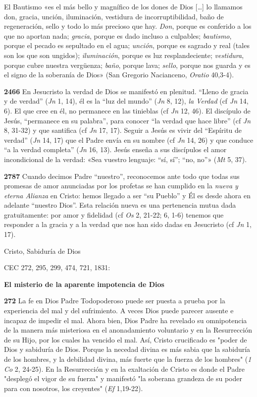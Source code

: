 \documentclass[]{article}
\begin{document}
El Bautismo «es el más bello y magnífico de los dones de Dios [\ldots{}]
lo llamamos don, gracia, unción, iluminación, vestidura de
incorruptibilidad, baño de regeneración, sello y todo lo más precioso
que hay. \emph{Don}, porque es conferido a los que no aportan nada;
\emph{gracia}, porque es dado incluso a culpables; \emph{bautismo},
porque el pecado es sepultado en el agua; \emph{unción}, porque es
sagrado y real (tales son los que son ungidos); \emph{iluminación},
porque es luz resplandeciente; \emph{vestidura}, porque cubre nuestra
vergüenza; \emph{baño}, porque lava; \emph{sello}, porque nos guarda y
es el signo de la soberanía de Dios» (San Gregorio Nacianceno,
\emph{Oratio} 40,3-4).

\textbf{2466} En Jesucristo la verdad de Dios se manifestó en plenitud.
``Lleno de gracia y de verdad'' (\emph{Jn} 1, 14), él es la ``luz del
mundo'' (\emph{Jn} 8, 12), \emph{la Verdad} (cf \emph{Jn} 14, 6). El que
cree en él, no permanece en las tinieblas (cf \emph{Jn} 12, 46). El
discípulo de Jesús, ``permanece en su palabra'', para conocer ``la
verdad que hace libre'' (cf \emph{Jn} 8, 31-32) y que santifica (cf
\emph{Jn} 17, 17). Seguir a Jesús es vivir del ``Espíritu de verdad''
(\emph{Jn} 14, 17) que el Padre envía en su nombre (cf \emph{Jn} 14, 26)
y que conduce ``a la verdad completa'' (\emph{Jn} 16, 13). Jesús enseña
a sus discípulos el amor incondicional de la verdad: «Sea vuestro
lenguaje: ``sí, sí''; ``no, no''» (\emph{Mt} 5, 37).

\textbf{2787} Cuando decimos Padre ``nuestro'', reconocemos ante todo
que todas sus promesas de amor anunciadas por los profetas se han
cumplido en la \emph{nueva y eterna Alianza} en Cristo: hemos llegado a
ser ``su Pueblo'' y Él es desde ahora en adelante ``nuestro Dios''. Esta
relación nueva es una pertenencia mutua dada gratuitamente: por amor y
fidelidad (cf \emph{Os} 2, 21-22; 6, 1-6) tenemos que responder a la
gracia y a la verdad que nos han sido dadas en Jesucristo (cf \emph{Jn}
1, 17).

Cristo, Sabiduría de Dios

CEC 272, 295, 299, 474, 721, 1831:

\textbf{El misterio de la aparente impotencia de Dios}

\textbf{272} La fe en Dios Padre Todopoderoso puede ser puesta a prueba
por la experiencia del mal y del sufrimiento. A veces Dios puede parecer
ausente e incapaz de impedir el mal. Ahora bien, Dios Padre ha revelado
su omnipotencia de la manera más misteriosa en el anonadamiento
voluntario y en la Resurrección de su Hijo, por los cuales ha vencido el
mal. Así, Cristo crucificado es "poder de Dios y sabiduría de Dios.
Porque la necedad divina es más sabia que la sabiduría de los hombres, y
la debilidad divina, más fuerte que la fuerza de los hombres" (\emph{1
Co} 2, 24-25). En la Resurrección y en la exaltación de Cristo es donde
el Padre "desplegó el vigor de su fuerza" y manifestó "la soberana
grandeza de su poder para con nosotros, los creyentes" (\emph{Ef}
1,19-22).
\end{document}
